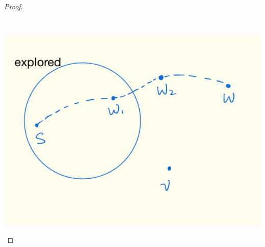 \documentclass[11pt, a4paper]{article} %
\theoremstyle{definition}
\begin{document}
\begin{proof}
\begin{enumerate}
\\
\begin{center}
\includegraphics[scale = 0.35]{p1.png}
\end{center}


\end{enumerate}
\end{proof}
\end{document}
